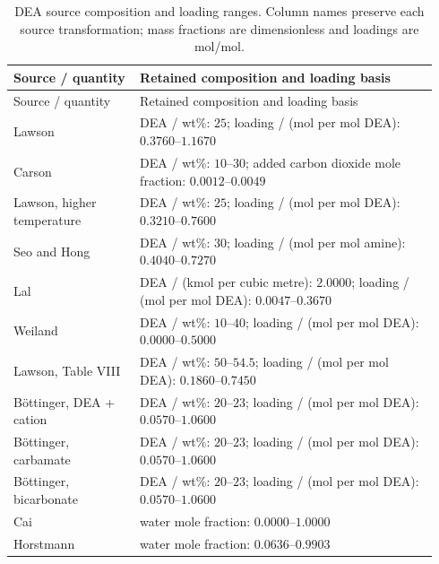 \begingroup\small\setlength{\tabcolsep}{2pt}\begin{longtable}{@{}>{\raggedright\arraybackslash}p{0.28\linewidth}>{\raggedright\arraybackslash}p{0.66\linewidth}@{}}
\caption{DEA source composition and loading ranges. Column names preserve each source transformation; mass fractions are dimensionless and loadings are mol/mol.}\label{tab:p2-dea-inventory-current}\\
\toprule Source / quantity & Retained composition and loading basis \\ \midrule
\endfirsthead\toprule Source / quantity & Retained composition and loading basis \\ \midrule
\endhead\bottomrule\endfoot
Lawson & DEA / wt\%: $25$; loading / (mol per mol DEA): $0.3760$--$1.1670$ \\
Carson & DEA / wt\%: $10$--$30$; added carbon dioxide mole fraction: $0.0012$--$0.0049$ \\
Lawson, higher temperature & DEA / wt\%: $25$; loading / (mol per mol DEA): $0.3210$--$0.7600$ \\
Seo and Hong & DEA / wt\%: $30$; loading / (mol per mol amine): $0.4040$--$0.7270$ \\
Lal & DEA / (kmol per cubic metre): $2.0000$; loading / (mol per mol DEA): $0.0047$--$0.3670$ \\
Weiland & DEA / wt\%: $10$--$40$; loading / (mol per mol DEA): $0.0000$--$0.5000$ \\
Lawson, Table VIII & DEA / wt\%: $50$--$54.5$; loading / (mol per mol DEA): $0.1860$--$0.7450$ \\
B\"ottinger, DEA + cation & DEA / wt\%: $20$--$23$; loading / (mol per mol DEA): $0.0570$--$1.0600$ \\
B\"ottinger, carbamate & DEA / wt\%: $20$--$23$; loading / (mol per mol DEA): $0.0570$--$1.0600$ \\
B\"ottinger, bicarbonate & DEA / wt\%: $20$--$23$; loading / (mol per mol DEA): $0.0570$--$1.0600$ \\
Cai & water mole fraction: $0.0000$--$1.0000$ \\
Horstmann & water mole fraction: $0.0636$--$0.9903$ \\
\end{longtable}\endgroup
